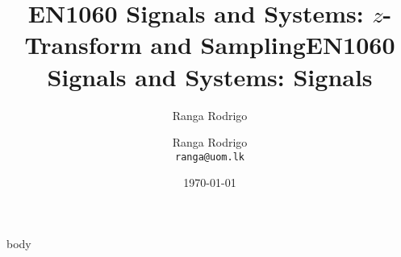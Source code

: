 \documentclass[t, aspectratio=169,xcolor={svgnames}, 10pt, handout]{beamer}
\title{EN1060 Signals and Systems: $z$-Transform and Sampling}
\title{EN1060 Signals and Systems: Signals}
\author{Ranga Rodrigo}
\author[]{Ranga Rodrigo\\ \texttt{ranga@uom.lk}}
\institute[]{The University of Moratuwa, Sri Lanka}
\date{\today}
\begin{document}
    \begin{frame}
        \titlepage
    \end{frame}



    {body}















\end{document}
